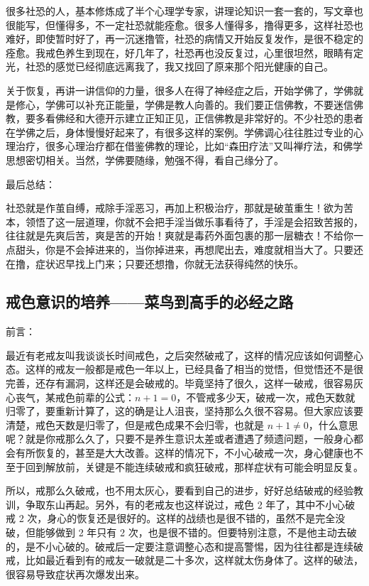 \documentclass{ctexart}
\begin{document}
很多社恐的人，基本修炼成了半个心理学专家，讲理论知识一套一套的，写文章也很能写，但懂得多，不一定社恐就能痊愈。很多人懂得多，撸得更多，这样社恐也难好，即使暂时好了，再一沉迷撸管，社恐的病情又开始反复发作，是很不稳定的痊愈。我戒色养生到现在，好几年了，社恐再也没反复过，心里很坦然，眼睛有定光，社恐的感觉已经彻底远离我了，我又找回了原来那个阳光健康的自己。

关于恢复，再讲一讲信仰的力量，很多人在得了神经症之后，开始学佛了，学佛就是修心，学佛可以补充正能量，学佛是教人向善的。我们要正信佛教，不要迷信佛教，要多看佛经和大德开示建立正知正见，正信佛教是非常好的。不少社恐的患者在学佛之后，身体慢慢好起来了，有很多这样的案例。学佛调心往往胜过专业的心理治疗，很多心理治疗都在借鉴佛教的理论，比如“森田疗法”又叫禅疗法，和佛学思想密切相关。当然，学佛要随缘，勉强不得，看自己缘分了。

最后总结：

社恐就是作茧自缚，戒除手淫恶习，再加上积极治疗，那就是破茧重生！欲为苦本，领悟了这一层道理，你就不会把手淫当做乐事看待了，手淫是会招致苦报的，往往就是先爽后苦，爽是苦的开始！爽就是毒药外面包裹的那一层糖衣！不给你一点甜头，你是不会掉进来的，当你掉进来，再想爬出去，难度就相当大了。只要还在撸，症状迟早找上门来；只要还想撸，你就无法获得纯然的快乐。

\subsection{戒色意识的培养——菜鸟到高手的必经之路}

前言：

最近有老戒友叫我谈谈长时间戒色，之后突然破戒了，这样的情况应该如何调整心态。这样的戒友一般都是戒色一年以上，已经具备了相当的觉悟，但觉悟还不是很完善，还存有漏洞，这样还是会破戒的。毕竟坚持了很久，这样一破戒，很容易灰心丧气，某戒色前辈的公式：$n + 1 = 0$，不管戒多少天，破戒一次，戒色天数就归零了，要重新计算了，这的确是让人沮丧，坚持那么久很不容易。但大家应该要清楚，戒色天数是归零了，但是戒色成果不会归零，也就是 $n + 1 \neq 0$，什么意思呢？就是你戒那么久了，只要不是养生意识太差或者遭遇了频遗问题，一般身心都会有所恢复的，甚至是大大改善。这样的情况下，不小心破戒一次，身心健康也不至于回到解放前，关键是不能连续破戒和疯狂破戒，那样症状有可能会明显反复。

所以，戒那么久破戒，也不用太灰心，要看到自己的进步，好好总结破戒的经验教训，争取东山再起。另外，有的老戒友也这样说过，戒色 2 年了，其中不小心破戒 2 次，身心的恢复还是很好的。这样的战绩也是很不错的，虽然不是完全没破，但能够做到 2 年只有 2 次，也是很不错的。但要特别注意，不是他主动去破的，是不小心破的。破戒后一定要注意调整心态和提高警惕，因为往往都是连续破戒，比如最近看到有的戒友一破就是二十多次，这样就太伤身体了。这样的破法，很容易导致症状再次爆发出来。
\end{document}

